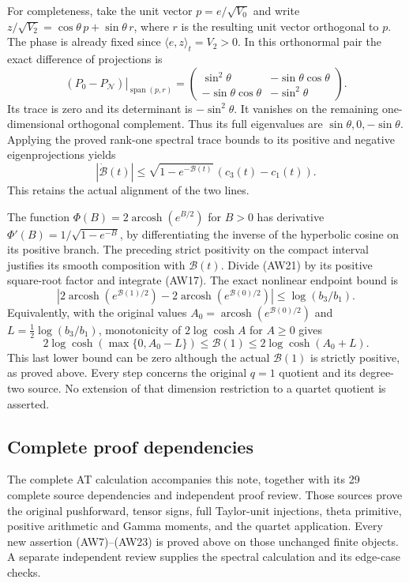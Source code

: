 For completeness, take the unit vector $p=e/\sqrt{V_0}$
and write $z/\sqrt{V_2}=\cos\theta\,p+\sin\theta\,r$,
where $r$ is the resulting unit vector orthogonal to $p$.
The phase is already fixed since $\langle e,z\rangle_t=V_2>0$.
In this orthonormal pair the exact difference of projections is
\[
 \left.(P_0-P_{\mathcal N})\right|_{\operatorname{span}(p,r)}
 =\begin{pmatrix}
   \sin^2\theta&-\sin\theta\cos\theta\\
   -\sin\theta\cos\theta&-\sin^2\theta
  \end{pmatrix}.
 \tag{AW20}
\]
Its trace is zero and its determinant is $-\sin^2\theta$.
It vanishes on the remaining one-dimensional orthogonal
complement. Thus its full eigenvalues are
$\sin\theta,0,-\sin\theta$.
Applying the proved rank-one spectral trace bounds to its
positive and negative eigenprojections yields
\[
 |\dot{\mathcal B}(t)|
 \le\sqrt{1-e^{-\mathcal B(t)}}\,(c_3(t)-c_1(t)).
 \tag{AW21}
\]
This retains the actual alignment of the two lines.

The function $\Phi(B)=2\operatorname{arcosh}(e^{B/2})$
for $B>0$ has derivative
$\Phi'(B)=1/\sqrt{1-e^{-B}}$, by differentiating the
inverse of the hyperbolic cosine on its positive branch.
The preceding strict positivity on the compact interval
justifies its smooth composition with $\mathcal B(t)$.
Divide (AW21) by its positive square-root factor and
integrate (AW17). The exact nonlinear endpoint bound is
\[
 \left|2\operatorname{arcosh}(e^{\mathcal B(1)/2})
       -2\operatorname{arcosh}(e^{\mathcal B(0)/2})\right|
       \le\log(b_3/b_1).
 \tag{AW22}
\]
Equivalently, with the original values
$A_0=\operatorname{arcosh}(e^{\mathcal B(0)/2})$
and $L=\tfrac12\log(b_3/b_1)$, monotonicity of
$2\log\cosh A$ for $A\ge0$ gives
\[
 2\log\cosh(\max\{0,A_0-L\})
 \le\mathcal B(1)\le2\log\cosh(A_0+L).
 \tag{AW23}
\]
This last lower bound can be zero although the actual
$\mathcal B(1)$ is strictly positive, as proved above.
Every step concerns the original $q=1$ quotient and its
degree-two source. No extension of that dimension restriction
to a quartet quotient is asserted.

\subsection{Complete proof dependencies}

The complete AT calculation accompanies this note, together with its
29 complete source dependencies and independent proof review. Those
sources prove the original pushforward, tensor signs, full Taylor-unit
injections, theta primitive, positive arithmetic and Gamma moments,
and the quartet application. Every new assertion (AW7)--(AW23) is
proved above on those unchanged finite objects. A separate independent
review supplies the spectral calculation and its edge-case checks.

\endgroup
